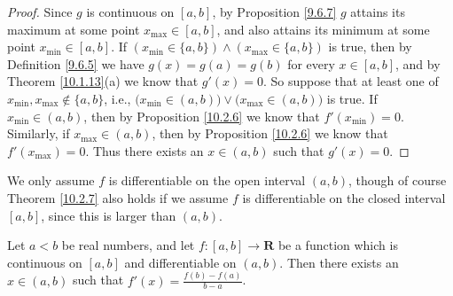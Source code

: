 \begin{proof}
    Since \(g\) is continuous on \([a, b]\), by Proposition \ref{9.6.7} \(g\) attains its maximum at some point \(x_{\max} \in [a, b]\), and also attains its minimum at some point \(x_{\min} \in [a, b]\).
    If \((x_{\min} \in \{a, b\}) \land (x_{\max} \in \{a, b\})\) is true, then by Definition \ref{9.6.5} we have \(g(x) = g(a) = g(b)\) for every \(x \in [a, b]\), and by Theorem \ref{10.1.13}(a) we know that \(g'(x) = 0\).
    So suppose that at least one of \(x_{\min}, x_{\max} \notin \{a, b\}\), i.e., \(\big(x_{\min} \in (a, b)\big) \lor \big(x_{\max} \in (a, b)\big)\) is true.
    If \(x_{\min} \in (a, b)\), then by Proposition \ref{10.2.6} we know that \(f'(x_{\min}) = 0\).
    Similarly, if \(x_{\max} \in (a, b)\), then by Proposition \ref{10.2.6} we know that \(f'(x_{\max}) = 0\).
    Thus there exists an \(x \in (a, b)\) such that \(g'(x) = 0\).
\end{proof}

\begin{remark}\label{10.2.8}
    We only assume \(f\) is differentiable on the open interval \((a, b)\), though of course Theorem \ref{10.2.7} also holds if we assume \(f\) is differentiable on the closed interval \([a, b]\), since this is larger than \((a, b)\).
\end{remark}

\begin{corollary}\label{10.2.9}
    Let \(a < b\) be real numbers, and let \(f : [a, b] \to \mathbf{R}\) be a function which is continuous on \([a, b]\) and differentiable on \((a, b)\).
    Then there exists an \(x \in (a, b)\) such that \(f'(x) = \frac{f(b) - f(a)}{b - a}\).
\end{corollary}

